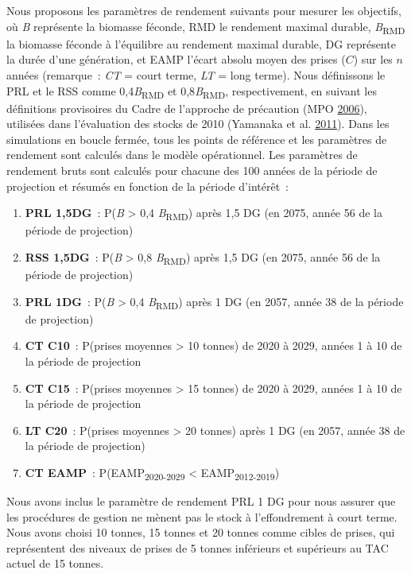\documentclass[french,11pt]{book}
\begin{document}
Nous proposons les paramètres de rendement suivants pour mesurer les objectifs, où \emph{B} représente la biomasse féconde, RMD le rendement maximal durable, \emph{B}\textsubscript{RMD} la biomasse féconde à l'équilibre au rendement maximal durable, DG représente la durée d'une génération, et EAMP l'écart absolu moyen des prises (\(C\)) sur les \(n\) années (remarque~: \emph{CT} = court terme, \emph{LT} = long terme). Nous définissons le PRL et le RSS comme 0,4\emph{B}\textsubscript{RMD} et 0,8\emph{B}\textsubscript{RMD}, respectivement, en suivant les définitions provisoires du Cadre de l'approche de précaution (MPO \protect\hyperlink{ref-dfo2006}{2006}), utilisées dans l'évaluation des stocks de 2010 (Yamanaka et al. \protect\hyperlink{ref-yamanaka2011}{2011}). Dans les simulations en boucle fermée, tous les points de référence et les paramètres de rendement sont calculés dans le modèle opérationnel. Les paramètres de rendement bruts sont calculés pour chacune des 100 années de la période de projection et résumés en fonction de la période d'intérêt~:
\begin{enumerate}
\def\labelenumi{\arabic{enumi}.}

\item
  \textbf{PRL 1,5DG}~: P(\emph{B} \textgreater{} 0,4 \emph{B}\textsubscript{RMD}) après 1,5 DG (en 2075, année 56 de la période de projection)
\item
  \textbf{RSS 1,5DG}~: P(\emph{B} \textgreater{} 0,8 \emph{B}\textsubscript{RMD}) après 1,5 DG (en 2075, année 56 de la période de projection)
\item
  \textbf{PRL 1DG}~: P(\emph{B} \textgreater{} 0,4 \emph{B}\textsubscript{RMD}) après 1 DG (en 2057, année 38 de la période de projection)
\item
  \textbf{CT C10}~: P(prises moyennes \textgreater{} 10 tonnes) de 2020 à 2029, années 1 à 10 de la période de projection
\item
  \textbf{CT C15}~: P(prises moyennes \textgreater{} 15 tonnes) de 2020 à 2029, années 1 à 10 de la période de projection
\item
  \textbf{LT C20}~: P(prises moyennes \textgreater{} 20 tonnes) après 1 DG (en 2057, année 38 de la période de projection)
\item
  \textbf{CT EAMP}~: P(EAMP\textsubscript{2020-2029} \textless{} EAMP\textsubscript{2012-2019})
\end{enumerate}
Nous avons inclus le paramètre de rendement PRL 1 DG pour nous assurer que les procédures de gestion ne mènent pas le stock à l'effondrement à court terme. Nous avons choisi 10 tonnes, 15 tonnes et 20 tonnes comme cibles de prises, qui représentent des niveaux de prises de 5 tonnes inférieurs et supérieurs au TAC actuel de 15 tonnes.
\end{document}
